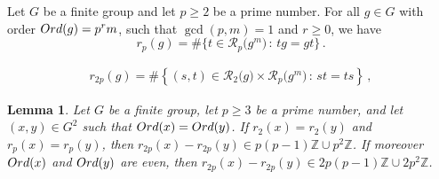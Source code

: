 \documentclass[10pt,a4paper]{amsart}
\newtheorem{lem}{Lemma}
\newcommand{\Ord}{{\rm Ord}}
\newcommand{\Z}{\mathbb Z}
\begin{document}
    Let $G$ be a finite group and let $p\ge2$ be a prime number. For all $g\in G $ with order $\Ord(g)=p^rm$, such that $\gcd(p,m)=1$ and $r\ge0$, we have \begin{equation}\label{p-rootsnumber}
        r_p(g)=\#\{t\in \mathcal{R}_p\bigl(g^m\bigr)\, \colon\,  tg=gt\}\, .
    \end{equation}

    \begin{align}
        r_{2p}(g)=\#\left\{(s,t)\in \mathcal{R}_2\bigl(g\bigr) \times\mathcal{R}_p\bigl(g^m\bigr)\, \colon\,  st=ts\right\}\label{2p-rootsnumb2}\, ,
    \end{align}

\begin{lem}\label{difference2proots}
    Let $G$ be a finite group, let $p\ge 3$ be a prime number, and let $(x,y)\in G^2$ such that $\Ord(x)=\Ord(y)$. If $r_2(x)=r_2(y)$ and $r_p(x)=r_p(y)$, then $r_{2p}(x)-r_{2p}(y) \in p(p-1)\Z \cup p^2\Z$. If moreover $\Ord(x)$ and $\Ord(y)$ are even, then $r_{2p}(x)-r_{2p}(y) \in 2p(p-1)\Z\cup 2p^2\Z$.
\end{lem}
\end{document}

